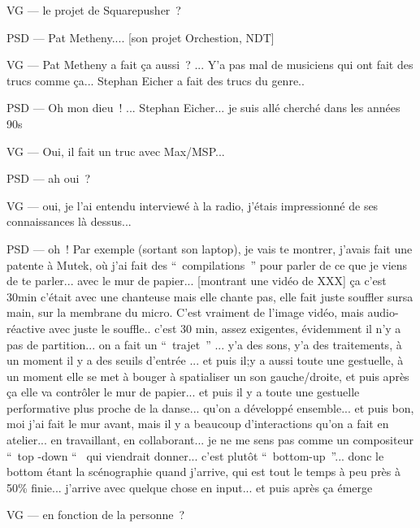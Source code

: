 VG — le projet de Squarepusher ? 

PSD — Pat Metheny.... [son projet Orchestion, NDT] 

VG — Pat Metheny a fait ça aussi ? ... Y'a pas mal de musiciens qui ont fait des trucs comme ça... Stephan Eicher a fait des trucs du genre.. 

PSD — Oh mon dieu ! ... Stephan Eicher... je suis allé cherché dans les années 90s 

VG — Oui, il fait un truc avec Max/MSP... 

PSD — ah oui ? 

VG — oui, je l'ai entendu interviewé à la radio, j'étais impressionné de ses connaissances là dessus... 

PSD — oh ! Par exemple (sortant son laptop), je vais te montrer, j'avais fait une patente à Mutek, où j'ai fait des “ compilations ” pour parler de ce que je viens de te parler... avec le mur de papier... [montrant une vidéo de XXX] ça c'est 30min c'était avec une chanteuse mais elle chante pas, elle fait juste souffler sursa main, sur  la membrane du micro. C'est vraiment de l'image vidéo, mais audio-réactive avec juste le souffle.. c'est 30 min, assez exigentes, évidemment il n'y a pas de partition... on a fait un “ trajet ” ... y'a des sons, y'a des traitements, à un moment il y a des seuils d'entrée ... et puis il;y a aussi toute une gestuelle, à un moment elle se met à bouger à spatialiser un son gauche/droite, et puis après ça elle va contrôler le mur de papier... et puis il y a toute une gestuelle performative plus proche de la danse... qu'on a développé ensemble... et puis bon, moi j'ai fait le mur avant, mais il y a beaucoup d'interactions qu'on a fait en atelier... en travaillant, en collaborant... je ne me sens pas comme un compositeur “ top -down “  qui viendrait donner... c'est plutôt “ bottom-up ”... donc le bottom étant la scénographie quand j'arrive, qui est tout le temps à peu près à 50\% finie... j'arrive avec quelque chose en input... et puis après ça émerge 

VG — en fonction de la personne ? 

